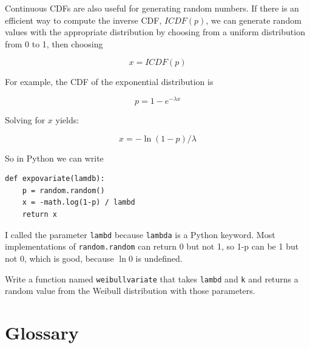 \documentclass[12pt]{book}
\begin{document}
Continuous CDFs are also useful for generating random numbers.
If there is an efficient way to compute the inverse CDF, $ICDF(p)$,
we can generate random values with the appropriate distribution
by choosing from a uniform distribution from 0 to 1, then choosing

\[ x = ICDF(p) \]

For example, the CDF of the exponential distribution is

\[ p = 1 - e^{-\lambda x} \]

Solving for $x$ yields:

\[ x = -\ln (1-p) / \lambda \]

So in Python we can write

\begin{verbatim}
def expovariate(lamdb):
    p = random.random()
    x = -math.log(1-p) / lambd
    return x
\end{verbatim}

I called the parameter \verb"lambd" because \verb"lambda" is a Python
keyword.  Most implementations of {\tt random.random} can return 0 but
not 1, so 1-p can be 1 but not 0, which is good, because $\ln 0$ is
undefined.

\begin{ex}

Write a function named \verb"weibullvariate" that takes
\verb"lambd" and \verb"k" and returns a random value from the Weibull
distribution with those parameters.

\end{ex}


\section{Glossary}
\end{document}
